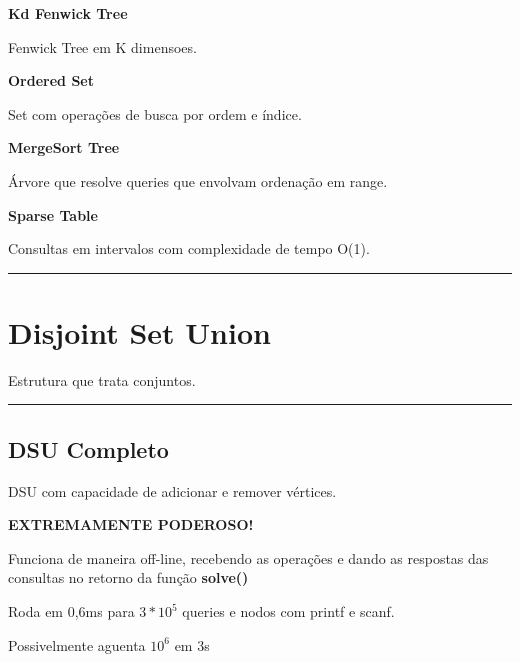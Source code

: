 \documentclass[11pt, a4paper, twoside]{book}
\begin{document}
\textbf{Kd Fenwick Tree} 



Fenwick Tree em K dimensoes.





\textbf{Ordered Set} 



Set com operações de busca por ordem e índice.





\textbf{MergeSort Tree} 



Árvore que resolve queries que envolvam ordenação em range.





\textbf{Sparse Table} 



Consultas em intervalos com complexidade de tempo O(1).






\hfill

\rule{\textwidth}{0.4pt}

\section{Disjoint Set Union}



Estrutura que trata conjuntos.


\hfill

\rule{\textwidth}{0.4pt}

\subsection{DSU Completo}



DSU com capacidade de adicionar e remover vértices.  



\textbf{EXTREMAMENTE PODEROSO!}  



Funciona de maneira off-line, recebendo as operações e dando as respostas das consultas no retorno da função \textbf{solve()}





Roda em 0,6ms para $3 * 10^5$ queries e nodos com printf e scanf.  

Possivelmente aguenta $10^6$ em 3s
\end{document}
